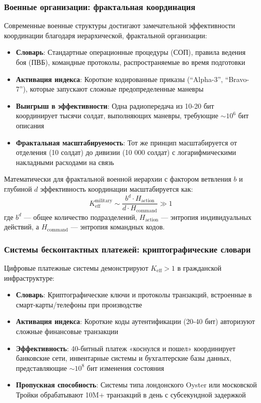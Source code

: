 \documentclass[11pt,a4paper]{article}
\begin{document}
	\subsubsection{Военные организации: фрактальная координация}
	Современные военные структуры достигают замечательной эффективности координации благодаря иерархической, фрактальной организации:
	\begin{itemize}
		\item \textbf{Словарь}: Стандартные операционные процедуры (СОП), правила ведения боя (ПВБ), командные протоколы, распространяемые во время подготовки
		\item \textbf{Активация индекса}: Короткие кодированные приказы (``Alpha-3'', ``Bravo-7''), которые запускают сложные предопределенные маневры
		\item \textbf{Выигрыш в эффективности}: Одна радиопередача из 10-20 бит координирует тысячи солдат, выполняющих маневры, требующие $\sim 10^6$ бит описания
		\item \textbf{Фрактальная масштабируемость}: Тот же принцип масштабируется от отделения (10 солдат) до дивизии (10 000 солдат) с логарифмическими накладными расходами на связь
	\end{itemize}
	
	Математически для фрактальной военной иерархии с фактором ветвления $b$ и глубиной $d$ эффективность координации масштабируется как:
	\begin{equation}
		K_{\mathrm{eff}}^{\text{military}} \sim \frac{b^d \cdot H_{\text{action}}}{d \cdot H_{\text{command}}} \gg 1
	\end{equation}
	где $b^d$ — общее количество подразделений, $H_{\text{action}}$ — энтропия индивидуальных действий, а $H_{\text{command}}$ — энтропия командных кодов.
	
	\subsubsection{Системы бесконтактных платежей: криптографические словари}
	Цифровые платежные системы демонстрируют $K_{\mathrm{eff}} > 1$ в гражданской инфраструктуре:
	\begin{itemize}
		\item \textbf{Словарь}: Криптографические ключи и протоколы транзакций, встроенные в смарт-карты/телефоны при производстве
		\item \textbf{Активация индекса}: Короткие коды аутентификации (20-40 бит) авторизуют сложные финансовые транзакции
		\item \textbf{Эффективность}: 40-битный платеж «коснулся и пошел» координирует банковские сети, инвентарные системы и бухгалтерские базы данных, представляющие $\sim 10^8$ бит изменения состояния
		\item \textbf{Пропускная способность}: Системы типа лондонского Oyster или московской Тройки обрабатывают 10M+ транзакций в день с субсекундной задержкой
	\end{itemize}
	
\end{document}
